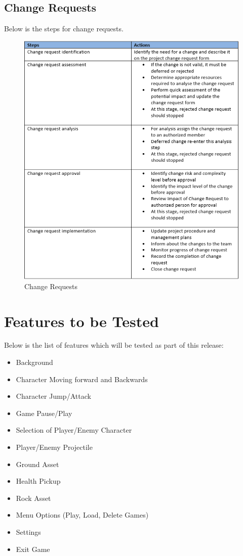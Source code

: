 \documentclass{article}
\begin{document}
\subsection{Change Requests}
Below is the steps for change requests.
\begin{figure}[h]
    \centering
    \includegraphics[scale=0.9]{./images/StepsControl.PNG}
    \caption{Change Requests}
    \label{fig:my_label}
\end{figure}
\newpage

\section{Features to be Tested}
Below is the list of features which will be tested as part of this release:

\begin{itemize}
    \item Background 
    \item Character Moving forward and Backwards
    \item Character Jump/Attack
    \item Game Pause/Play
    \item Selection of Player/Enemy Character
    \item Player/Enemy Projectile
    \item Ground Asset
    \item Health Pickup
    \item Rock Asset
    \item Menu Options (Play, Load, Delete Games)
    \item Settings
    \item Exit Game
    
\end{itemize}
\end{document}

